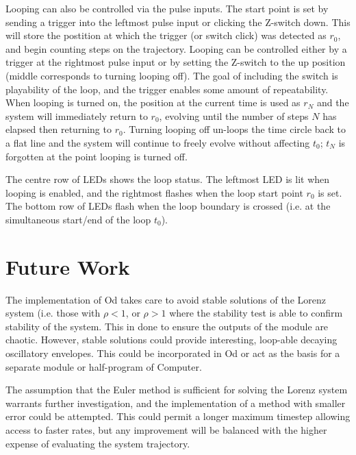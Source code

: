 \documentclass{tufte-handout}
\begin{document}
Looping can also be controlled via the pulse inputs. The start point is set by sending a trigger into the leftmost pulse input or clicking the Z-switch down. This will store the postition at which the trigger (or switch click) was detected as $r_0$, and begin counting steps on the trajectory. Looping can be controlled either by a trigger at the rightmost pulse input or by setting the Z-switch to the up position (middle corresponds to turning looping off). The goal of including the switch is playability of the loop, and the trigger enables some amount of repeatability. When looping is turned on, the position at the current time is used as $r_N$ and the system will immediately return to $r_0$, evolving until the number of steps $N$ has elapsed then returning to $r_0$. Turning looping off un-loops the time circle back to a flat line and the system will continue to freely evolve without affecting $t_0$; $t_N$ is forgotten at the point looping is turned off.

The centre row of LEDs shows the loop status. The leftmost LED is lit when looping is enabled, and the rightmost flashes when the loop start point $r_0$ is set. The bottom row of LEDs flash when the loop boundary is crossed (i.e. at the simultaneous start/end of the loop $t_0$).


\section{Future Work}\label{sec:future_work}

The implementation of Od takes care to avoid stable solutions of the Lorenz system (i.e. those with $\rho < 1$, or $\rho > 1$ where the stability test is able to confirm stability of the system. This in done to ensure the outputs of the module are chaotic. However, stable solutions could provide interesting, loop-able decaying oscillatory envelopes. This could be incorporated in Od or act as the basis for a separate module or half-program of Computer.

The assumption that the Euler method is sufficient for solving the Lorenz system warrants further investigation, and the implementation of a method with smaller error could be attempted. This could permit a longer maximum timestep allowing access to faster rates, but any improvement will be balanced with the higher expense of evaluating the system trajectory.




\end{document}
